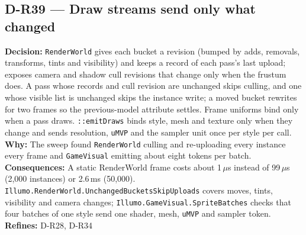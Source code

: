 \subsection*{D-R39 --- Draw streams send only what changed}
\begin{decisionbox}[title={D-R39 \quad 2026-10-03}]
\textbf{Decision:} \texttt{RenderWorld} gives each bucket a revision (bumped
by adds, removals, transforms, tints and visibility) and keeps a record of
each pass's last upload;  exposes camera and shadow cull
revisions that change only when the frustum does. A pass whose records and
cull revision are unchanged skips culling, and one whose visible list is
unchanged skips the instance write; a moved bucket rewrites for two frames so
the previous-model attribute settles. Frame uniforms bind only when a pass
draws. \texttt{::emitDraws} binds style, mesh and
texture only when they change and sends resolution, \texttt{uMVP} and the
sampler unit once per style per call.\\
\textbf{Why:} The sweep found \texttt{RenderWorld} culling and re-uploading
every instance every frame and \texttt{GameVisual} emitting about eight tokens
per batch.\\
\textbf{Consequences:} A static RenderWorld frame costs about 1\,$\mu$s
instead of 99\,$\mu$s (2,000 instances) or 2.6\,ms (50,000).
\texttt{Illumo.RenderWorld.UnchangedBucketsSkipUploads} covers moves, tints,
visibility and camera changes; \texttt{Illumo.GameVisual.SpriteBatches} checks
that four batches of one style send one shader, mesh, \texttt{uMVP} and
sampler token.\\
\textbf{Refines:} D-R28, D-R34
\end{decisionbox}

